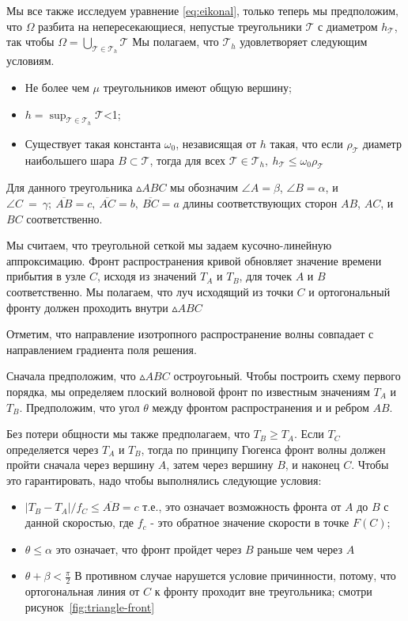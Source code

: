 Мы все также исследуем уравнение \eqref{eq:eikonal}, только теперь мы
предположим, что $\Omega$ разбита на непересекающиеся, непустые
треугольники $\mathcal{T}$ с диаметром $h_{\mathcal{T}}$, так чтобы
$\Omega = \bigcup_{\mathcal{T}\in \mathcal{T}_h}\mathcal{T}$ Мы
полагаем, что $\mathcal{T}_h$ удовлетворяет следующим условиям.
\begin{itemize}
\item Не более чем $\mu$ треугольников имеют общую вершину; 
\item $h = \sup_{\mathcal{T} \in \mathcal{T}_h}\mathcal{T}$<1;
\item Существует такая константа $\omega_0$, независящая от $h$ такая,
  что если $\rho_{\mathcal{T}}$ диаметр наибольшего шара $B \subset
  \mathcal{T}$, тогда для всех $\mathcal{T} \in \mathcal{T}_h,\
  h_{\mathcal{T}} \le \omega_0 \rho_{\mathcal{T}}$
\end{itemize}

Для данного треугольника $\vartriangle ABC$ мы обозначим $\angle A =
\beta $, $\angle B = \alpha$, и $\angle C~=~\gamma;\ \overline{AB} =
c,\ \overline{AC} =b,\ \overline{BC} =a$ длины соответствующих сторон
$AB$, $AC$, и $BC$ соответственно.

Мы считаем, что треугольной сеткой мы задаем кусочно-линейную
аппроксимацию. Фронт распространения кривой обновляет значение времени
прибытия в узле $C$, исходя из значений $T_A$ и $T_B$, для точек $A$ и
$B$ соответственно. Мы полагаем, что луч исходящий из точки $C$ и
ортогональный фронту должен проходить внутри $\vartriangle ABC$

Отметим, что направление изотропного распространение волны совпадает с
направлением градиента поля решения.

Сначала предположим, что $\vartriangle ABC$ остроугоьный. Чтобы
построить схему первого порядка, мы определяем плоский волновой фронт
по известным значениям $T_A$ и $T_B$. Предположим, что угол $\theta$
между фронтом распространения и и ребром $AB$.

Без потери общности мы также предполагаем, что $T_B \ge T_A$. Если
$T_C$ определяется через $T_A$ и $T_B$, тогда по принципу Гюгенса
фронт волны должен пройти сначала через вершину $A$, затем через
вершину $B$, и наконец $C$. Чтобы это гарантировать, надо чтобы
выполнялись следующие условия:
\begin{itemize}
\item $|T_B-T_A| / f_C \le \overline{AB} = c$ т.е., это означает
  возможность фронта от $A$ до $B$ с данной скоростью, где $f_c$ - это
  обратное значение скорости в точке $F(C)$;
  \item $\theta \le \alpha$ это означает, что фронт пройдет через $B$
    раньше чем через $A$
  \item $\theta + \beta < \frac{\pi}{2}$ В противном случае нарушется
    условие причинности, потому, что ортогональная линия от $C$ к
    фронту проходит вне треугольника; смотри рисунок~\ref{fig:triangle-front}
\end{itemize}

